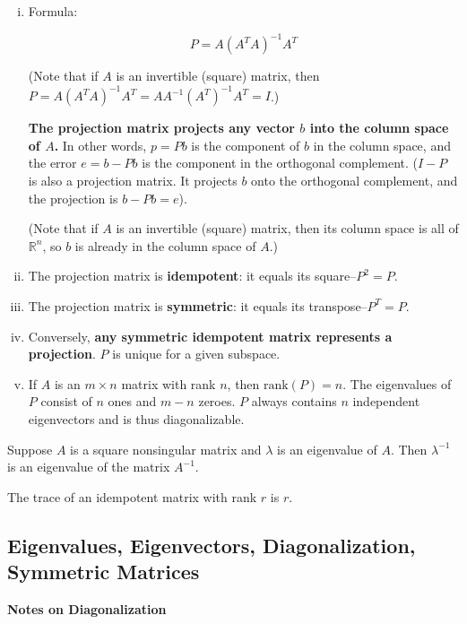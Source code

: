 \begin{enumerate}[i.]

\item Formula:

\[
P = A(A^TA)^{-1}A^T
\]

(Note that if \(A\) is an invertible (square) matrix, then \(P = A(A^TA)^{-1}A^T = AA^{-1}(A^T)^{-1}A^T = I\).)

\textbf{The projection matrix projects any vector \(b\) into the column space of \(A\).} In other words, \(p = Pb\) is the component of \(b\) in the column space, and the error \(e = b - Pb\) is the component in the orthogonal complement. (\(I - P\) is also a projection matrix. It projects \(b\) onto the orthogonal complement, and the projection is \(b - Pb = e\)).

(Note that if \(A\) is an invertible (square) matrix, then its column space is all of \(\mathbb{R}^n\), so \(b\) is already in the column space of \(A\).)

\item The projection matrix is \textbf{idempotent}: it equals its square--\(P^2 = P\).

\item The projection matrix is \textbf{symmetric}: it equals its transpose--\(P^T = P\).

\item Conversely, \textbf{any symmetric idempotent matrix represents a projection}. \(P\) is unique for a given subspace.

\item If \(A\) is an \(m \times n\) matrix with rank \(n\), then \(\text{rank} (P) = n\). The eigenvalues of \(P\) consist of \(n\) ones and \(m - n\) zeroes. \(P\) always contains \(n\) independent eigenvectors and is thus diagonalizable. 

\end{enumerate}

Suppose \(A\) is a square nonsingular matrix and \(\lambda\) is an eigenvalue of \(A\). Then \(\lambda^{-1}\) is an eigenvalue of the matrix \(A^{-1}\).

The trace of an idempotent matrix with rank \(r\) is \(r\).

\subsection{Eigenvalues, Eigenvectors, Diagonalization, Symmetric Matrices}

\textbf{Notes on Diagonalization}

